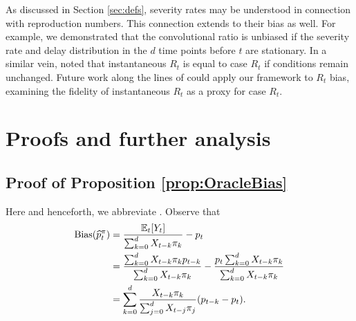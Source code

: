 \documentclass{article}
\renewcommand{\hat}{\widehat} %
\newcommand{\given}{\, \vert \,}
\DeclareMathOperator{\bias}{Bias}
\begin{document}
As discussed in Section \ref{sec:defs}, severity rates may be understood in
connection with reproduction numbers. This connection extends to their bias as
well. For example, we  demonstrated that the convolutional ratio is unbiased if
the severity rate and delay distribution in the $d$ time points before $t$ are 
stationary. In a similar vein, \citet{fraser2007} noted that instantaneous $R_t$
is equal to case $R_t$ if conditions remain unchanged. Future work along the
lines of \citet{rt_study} could apply our framework to $R_t$ bias, examining the
fidelity of instantaneous $R_t$ as a proxy for case $R_t$.   




\clearpage
\appendix

\section{Proofs and further analysis}
\label{apx:proofs}

\subsection{Proof of Proposition \ref{prop:OracleBias}}
\label{apx:OracleBias}

Here and henceforth, we abbreviate \smash{$\E_t[\cdot] = \E[\cdot \given
  \{X_s\}_{s\leq t}]$}. Observe that
\begin{align*}
\bias(\hat{p}_t^\pi) 
&= \frac{\E_t[Y_t]}{\sum_{k=0}^d X_{t-k}\pi_k} - p_t \\ 
&= \frac{\sum_{k=0}^d X_{t-k}\pi_k p_{t-k}}{\sum_{k=0}^d X_{t-k}\pi_k} - 
\frac{p_t \sum_{k=0}^d X_{t-k}\pi_k}{\sum_{k=0}^d X_{t-k}\pi_k} \\
&= \sum_{k=0}^d \frac{X_{t-k}\pi_k}{\sum_{j=0}^d X_{t-j}\pi_j} (p_{t-k}-p_t).
\end{align*}

\end{document}
